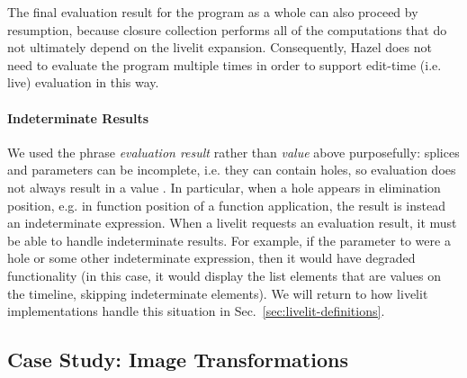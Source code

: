 The final evaluation result for the program as a whole can also proceed by resumption, because
closure collection performs all of the computations that do not ultimately depend on the livelit expansion.
Consequently, Hazel does not need to evaluate the program multiple times in order to support edit-time
(i.e. live) evaluation in this way.

\paragraph{Indeterminate Results}
We used the phrase \emph{evaluation result} rather than \emph{value} above purposefully:
splices and parameters can be incomplete, i.e. they can contain holes, so
evaluation does not always result in a value \cite{HazelnutLive}.
In particular, when a hole appears in elimination position, e.g. in function position of a function application,
 the result is instead an indeterminate expression.
When a livelit requests an evaluation result, it must be able to handle indeterminate results.
For example, if the parameter to  were a hole or some other indeterminate expression,
then it would have degraded functionality
(in this case, it would display the list elements that are values on the timeline, skipping indeterminate elements).
We will return to how livelit implementations handle this situation in Sec.~\ref{sec:livelit-definitions}.

\subsection{Case Study: Image Transformations}\label{sec:image-transformation}

